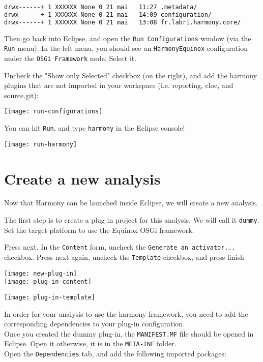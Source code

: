 \begin{lstlisting}[language=bash]
drwx------+ 1 XXXXXX None 0 21 mai   11:27 .metadata/
drwx------+ 1 XXXXXX None 0 21 mai   14:09 configuration/
drwx------+ 1 XXXXXX None 0 21 mai   13:08 fr.labri.harmony.core/
\end{lstlisting}


Then go back into Eclipse, and open the \texttt{Run Configurations} window (via the \texttt{Run} menu). In the left menu, you should see an \texttt{HarmonyEquinox} configuration under the \texttt{OSGi Framework} node. Select it.

Uncheck the "Show only Selected" checkbox (on the right), and add the harmony plugins that are not imported in your workspace (i.e. reporting, cloc, and source.git):

\noindent
\texttt{[image: run-configurations]}

You can hit \texttt{Run}, and type \texttt{harmony} in the Eclipse console!

\noindent
\texttt{[image: run-harmony]}

\section{Create a new analysis}

Now that Harmony can be launched inside Eclipse, we will create a new analysis.

The first step is to create a plug-in project for this analysis. We will call it \texttt{dummy}. Set the target platform to use the Equinox OSGi framework.

Press next. In the \texttt{Content} form, uncheck the \texttt{Generate an activator...} checkbox. Press next again, uncheck the \texttt{Template} checkbox, and press finish\\




\begin{center}
\texttt{[image: new-plug-in]}\\

\texttt{[image: plug-in-content]}

\texttt{[image: plug-in-template]}
\end{center}

In order for your analysis to use the harmony framework, you need to add the corresponding dependencies to your plug-in configuration.\\
Once you created the dummy plug-in, the \texttt{MANIFEST.MF} file should be opened in Eclipse. Open it otherwise, it is in the \texttt{META-INF} folder.\\
Open the \texttt{Dependencies} tab, and add the following imported packages:

